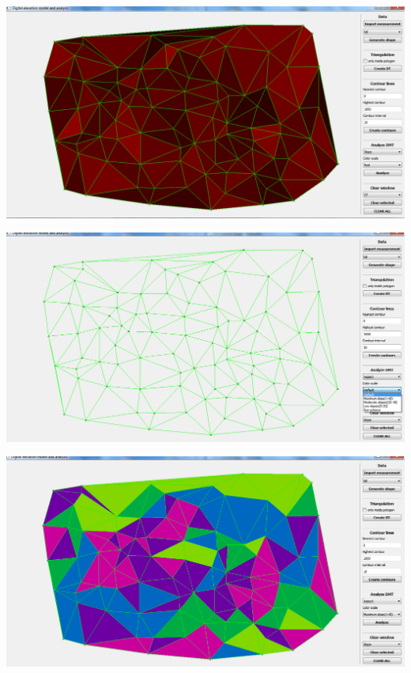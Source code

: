 \documentclass[12pt]{article}
\begin{document}
\begin{center}
   \includegraphics[width=14cm]{./img/slope_1_random_points.png}
\end{center}

\begin{center}
   \includegraphics[width=14cm]{./img/aspect_stupnice.png}
\end{center}

\begin{center}
   \includegraphics[width=14cm]{./img/aspect_1_random_points.png}
\end{center}
\end{document}
